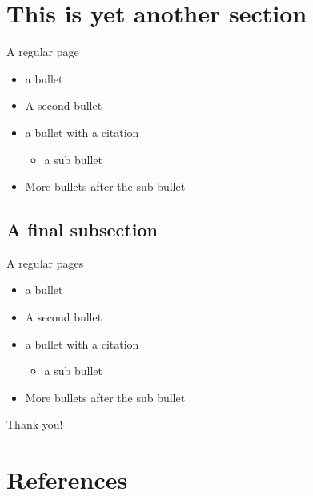 \documentclass{beamer}
\begin{document}
\section{This is yet another section}

\begin{frame}{A regular page}
    \begin{itemize}
        \item {
        a bullet
        }
        \item A second bullet
        \item a bullet with a citation \cite{Bonaccorsi2016}
        \begin{itemize}
            \item a sub bullet
        \end{itemize}
        \item More bullets after the sub bullet
    \end{itemize}
\end{frame}

\subsection{A final subsection}

\begin{frame}{A regular pages}
    \begin{itemize}
        \item {
        a bullet
        }
        \item A second bullet
        \item a bullet with a citation \cite{Bonaccorsi2016}
        \begin{itemize}
            \item a sub bullet
        \end{itemize}
        \item More bullets after the sub bullet
    \end{itemize}
\end{frame}

\begin{frame}[standout]
    Thank you!
\end{frame}

\section{References}
\begin{frame}[allowframebreaks]%
    \printbibliography
\end{frame}
\end{document}
